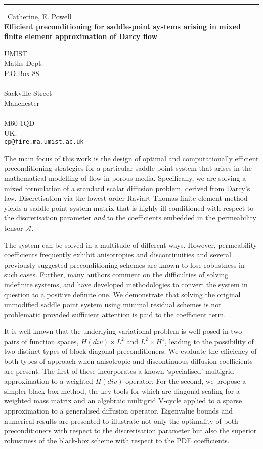 \documentclass{report}
\begin{document}
\begin{center}
\rule{6in}{1pt} \
{\large Catherine, E. Powell \\
{\bf Efficient preconditioning for saddle-point systems arising in mixed finite element approximation of Darcy flow}}

UMIST \\ Maths Dept. \\ P.O.Box 88 \\ \\ Sackville Street \\ Manchester \\ \\ M60 1QD \\ UK.
\\
{\tt cp@fire.ma.umist.ac.uk}\end{center}

The main focus of this work is the design of optimal and computationally
efficient preconditioning strategies for a particular saddle-point system
that arises in the mathematical modelling of flow in porous media.
Specifically, we are solving a mixed formulation of a standard scalar
diffusion problem, derived from Darcy's law. Discretisation via the
lowest-order Raviart-Thomas finite element method yields a saddle-point
system matrix that is highly ill-conditioned with respect to the
discretisation parameter \textit{and} to the coefficients embedded in the
permeability tensor $\mathcal{A}.$

The system can be solved in a multitude of different ways. However,
permeability coefficients frequently exhibit anisotropies and
discontinuities and several previously suggested preconditioning schemes
are known to lose robustness in such cases. Further, many authors comment
on the difficulties of solving indefinite systems, and have developed
methodologies to convert the system in question to a positive definite
one. We demonstrate that solving the original unmodified saddle point
system using minimal residual schemes is not problematic provided
sufficient attention is paid to the coefficient term.

It is well known that the underlying variational problem is well-posed in
two pairs of function spaces, $H(div)\times L^{2}$ and $L^{2} \times
H^{1}$, leading to the possibility of two distinct types of
block-diagonal preconditioners. We evaluate the efficiency of both types
of approach when anisotropic and discontinuous diffusion coefficients are
present. The
first of these incorporates a known `specialised' multigrid approximation
to a weighted $H(div)$ operator. For the
second, we propose a simpler black-box method, the key tools
for which are diagonal scaling for a weighted mass matrix and an
algebraic multigrid V-cycle applied to a sparse approximation to a
generalised diffusion operator. Eigenvalue bounds and numerical results
are presented to illustrate not only the optimality of both
preconditioners with respect to the discretisation parameter but also the
superior robustness of the black-box scheme with respect to the PDE
coefficients.
\end{document}
